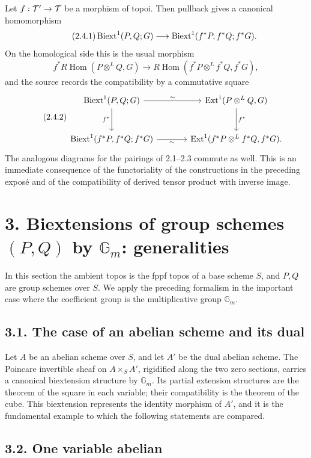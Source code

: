 \documentclass[11pt]{article}
\providecommand{\Gm}{\mathbb G_m}
\providecommand{\Hom}{\operatorname{Hom}}
\providecommand{\Ext}{\operatorname{Ext}}
\begin{document}
Let \(f:\mathcal T'\to\mathcal T\) be a morphism of topoi.  Then pullback gives a canonical homomorphism
\begin{equation}\tag{2.4.1}
        \operatorname{Biext}^1(P,Q;G)\longrightarrow
        \operatorname{Biext}^1(f^*P,f^*Q;f^*G).
\end{equation}
On the homological side this is the usual morphism
\[
        f^*R\!\Hom(P\otimes^LQ,G)\to
        R\!\Hom(f^*P\otimes^Lf^*Q,f^*G),
\]
and the source records the compatibility by a commutative square
\begin{equation}\tag{2.4.2}
\begin{tikzcd}[column sep=large,row sep=large]
\Biext^1(P,Q;G)\arrow[r,"\sim"]\arrow[d,"f^*"']&\Ext^1(P\otimes^LQ,G)\arrow[d,"f^*"]\\
\Biext^1(f^*P,f^*Q;f^*G)\arrow[r,"\sim"']&\Ext^1(f^*P\otimes^Lf^*Q,f^*G).
\end{tikzcd}
\end{equation}
The analogous diagrams for the pairings of 2.1--2.3 commute as well.  This is an immediate consequence of the functoriality of the constructions in the preceding exposé and of the compatibility of derived tensor product with inverse image.

\section*{3. Biextensions of group schemes \((P,Q)\) by \(\Gm\): generalities}

In this section the ambient topos is the fppf topos of a base scheme \(S\), and \(P,Q\) are group schemes over \(S\).  We apply the preceding formalism in the important case where the coefficient group is the multiplicative group \(\Gm\).

\subsection*{3.1. The case of an abelian scheme and its dual}

Let \(A\) be an abelian scheme over \(S\), and let \(A'\) be the dual abelian scheme.  The Poincare invertible sheaf on \(A\times_SA'\), rigidified along the two zero sections, carries a canonical biextension structure by \(\Gm\).  Its partial extension structures are the theorem of the square in each variable; their compatibility is the theorem of the cube.  This biextension represents the identity morphism of \(A'\), and it is the fundamental example to which the following statements are compared.

\subsection*{3.2. One variable abelian}
\end{document}
